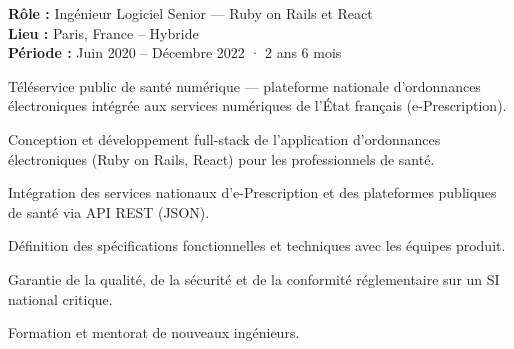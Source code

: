 \begin{cvgroup}

\begin{cvmetadata}
\textbf{Rôle :} Ingénieur Logiciel Senior — Ruby on Rails et React \\
\textbf{Lieu :} Paris, France – Hybride \\
\textbf{Période :} Juin 2020 – Décembre 2022 · 2 ans 6 mois
\end{cvmetadata}

\begin{cvprojectsummary}
Téléservice public de santé numérique — plateforme nationale d'ordonnances électroniques intégrée aux services numériques de l'État français (e-Prescription).
\end{cvprojectsummary}


\begin{cvdetailmissions}
  \item {Conception et développement full-stack de l'application d'ordonnances électroniques (Ruby on Rails, React) pour les professionnels de santé.}
  \item {Intégration des services nationaux d'e-Prescription et des plateformes publiques de santé via API REST (JSON).}
  \item {Définition des spécifications fonctionnelles et techniques avec les équipes produit.}
  \item {Garantie de la qualité, de la sécurité et de la conformité réglementaire sur un SI national critique.}
  \item {Formation et mentorat de nouveaux ingénieurs.}
\end{cvdetailmissions}

\end{cvgroup}

